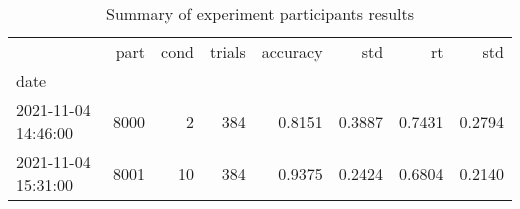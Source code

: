 \begin{table}
\centering
\caption{Summary of experiment participants results}
\label{table-subject-summary}
\begin{tabular}{lrrrrrrr}
\toprule
{} &  part & cond & trials & accuracy &    std &     rt &    std \\
date                &       &      &        &          &        &        &        \\
\midrule
2021-11-04 14:46:00 &  8000 &    2 &    384 &   0.8151 & 0.3887 & 0.7431 & 0.2794 \\
2021-11-04 15:31:00 &  8001 &   10 &    384 &   0.9375 & 0.2424 & 0.6804 & 0.2140 \\
\bottomrule
\end{tabular}
\end{table}
